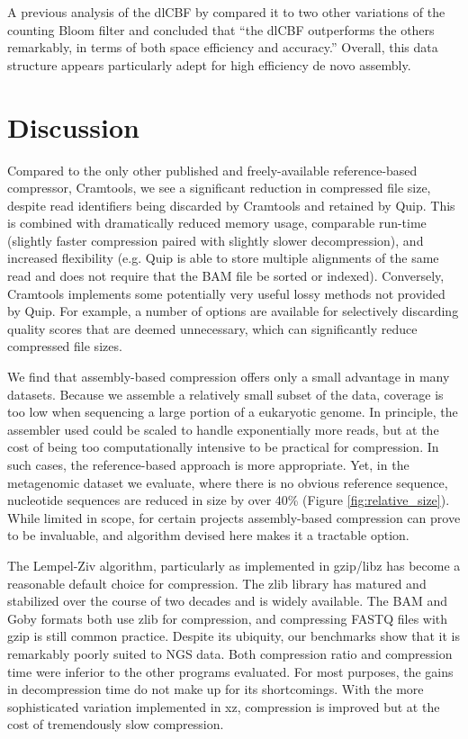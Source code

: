 \documentclass[twocolumn]{article}
\begin{document}
A previous analysis of the dlCBF by \citet{Zhang2009} compared it to two other
variations of the counting Bloom filter and concluded that ``the dlCBF
outperforms the others remarkably, in terms of both space efficiency and
accuracy.'' Overall, this data structure appears particularly adept for high
efficiency de novo assembly.

\section{Discussion}

Compared to the only other published and freely-available reference-based
compressor, Cramtools, we see a significant reduction in compressed file size,
despite read identifiers being discarded by Cramtools and retained by Quip.
This is combined with dramatically reduced memory usage, comparable run-time
(slightly faster compression paired with slightly slower decompression), and
increased flexibility (e.g. Quip is able to store multiple alignments of the
same read and does not require that the BAM file be sorted or indexed).
Conversely, Cramtools implements some potentially very useful lossy methods
not provided by Quip. For example, a number of options are available for
selectively discarding quality scores that are deemed unnecessary, which
can significantly reduce compressed file sizes.

We find that assembly-based compression offers only a small advantage in many
datasets. Because we assemble a relatively small subset of the data, coverage
is too low when sequencing a large portion of a eukaryotic genome. In
principle, the assembler used could be scaled to handle exponentially more
reads, but at the cost of being too computationally intensive to be practical
for compression. In such cases, the reference-based approach is more
appropriate. Yet, in the metagenomic dataset we evaluate, where there is no
obvious reference sequence, nucleotide sequences are reduced in size by over
40\% (Figure \ref{fig:relative_size}). While limited in scope, for certain
projects assembly-based compression can prove to be invaluable, and algorithm
devised here makes it a tractable option.

The Lempel-Ziv algorithm, particularly as implemented in gzip/libz has become
a reasonable default choice for compression. The zlib library has matured and
stabilized over the course of two decades and is widely available. The BAM and
Goby formats both use zlib for compression, and compressing FASTQ files with
gzip is still common practice. Despite its ubiquity, our benchmarks show that
it is remarkably poorly suited to NGS data. Both compression ratio and
compression time were inferior to the other programs evaluated. For most
purposes, the gains in decompression time do not make up for its shortcomings.
With the more sophisticated variation implemented in xz, compression is improved
but at the cost of tremendously slow compression.
\end{document}
